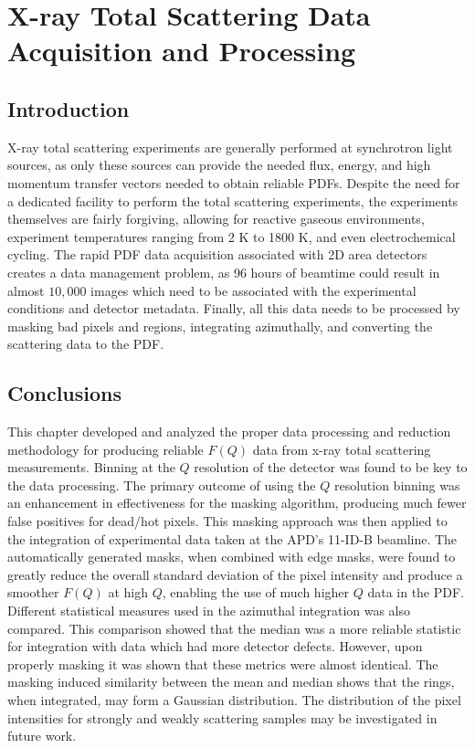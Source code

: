 \graphicspath{{dp/figures/}}
\chapter{X-ray Total Scattering Data Acquisition and Processing} \label{ch:dp}
\section{Introduction}
X-ray total scattering experiments are generally performed at synchrotron light sources, as only these sources can provide the needed flux, energy, and high momentum transfer vectors needed to obtain reliable PDFs. \cite{Chupas2003, Dykhne2011}
Despite the need for a dedicated facility to perform the total scattering experiments, the experiments themselves are fairly forgiving, allowing for reactive gaseous environments, experiment temperatures ranging from 2 \si{K} to 1800 \si{K}, and even electrochemical cycling. \cite{Chupas2008, Petkov2013, Redmond2012}
The rapid PDF data acquisition associated with 2D area detectors creates a data management problem, as 96 hours of beamtime could result in almost $10,000$ images which need to be associated with the experimental conditions and detector metadata. \cite{Chupas2003}
 Finally, all this data needs to be processed by masking bad pixels and regions, integrating azimuthally, and converting the scattering data to the PDF. \cite{Kieffer2013, Juhas2013, Yang2014, Pauw2014, Billinge2012}

%







\section{Conclusions}
This chapter developed and analyzed the proper data processing and reduction methodology for producing reliable $F(Q)$ data from x-ray total scattering measurements.
Binning at the $Q$ resolution of the detector was found to be key to the data processing.
The primary outcome of using the $Q$ resolution binning was an enhancement in effectiveness for the masking algorithm, producing much fewer false positives for dead/hot pixels.
This masking approach was then applied to the integration of experimental data taken at the APD's 11-ID-B beamline.
The automatically generated masks, when combined with edge masks, were found to greatly reduce the overall standard deviation of the pixel intensity and produce a smoother $F(Q)$ at high $Q$, enabling the use of much higher $Q$ data in the PDF.
Different statistical measures used in the azimuthal integration was also compared.
This comparison showed that the median was a more reliable statistic for integration with data which had more detector defects.
However, upon properly masking it was shown that these metrics were almost identical.
The masking induced similarity between the mean and median shows that the rings, when integrated, may form a Gaussian distribution.
The distribution of the pixel intensities for strongly and weakly scattering samples may be investigated in future work.
